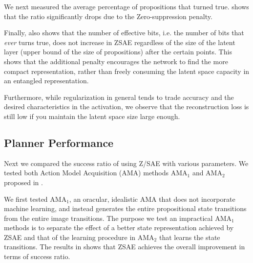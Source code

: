 We next measured the average percentage of propositions that turned true.
 shows that the ratio significantly drops due to the Zero-suppression penalty.

Finally,  also shows that the number of effective bits,
i.e. the number of bits that \emph{ever} turns true, does not increase in ZSAE
regardless of the size of the latent layer (upper bound of the size of
propositions) after the certain points.  This shows that the additional
penalty encourages the network to find the more compact representation,
rather than freely consuming the latent space capacity in an entangled representation.

Furthermore, while regularization in general tends to trade accuracy and
the desired characteristics in the activation, we observe that the
reconstruction loss is still low if you maintain the latent space size
large enough.

\subsection{Planner Performance}

Next we compared the success ratio of \latentplanner using Z/SAE with various parameters.
We tested both Action Model Acquisition (AMA) methods AMA$_1$ and AMA$_2$ proposed in \cite{Asai2018}.

We first tested AMA$_1$, an oracular, idealistic AMA that does not incorporate machine learning,
and instead generates the entire propositional state transitions from the entire image transitions.
The purpose we test an impractical AMA$_1$ methods is
to separate the effect of a better state representation achieved by ZSAE
and that of the learning procedure in AMA$_2$ that learns the state transitions.
The results in  shows that ZSAE achieves the overall improvement in terms of success ratio.

